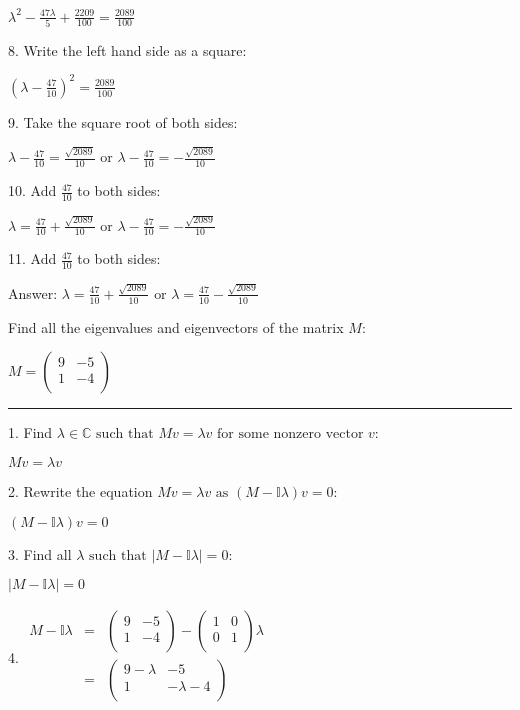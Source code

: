 \documentclass{article}
\begin{document}
$\lambda ^2-\frac{47 \lambda }{5}+\frac{2209}{100}=\frac{2089}{100}$

8. Write the left hand side as a square:

$\left(\lambda -\frac{47}{10}\right)^2=\frac{2089}{100}$

9. Take the square root of both sides:

$\lambda -\frac{47}{10}=\frac{\sqrt{2089}}{10}\text{ or }\lambda -\frac{47}{10}=-\frac{\sqrt{2089}}{10}$

10. Add $\frac{47}{10}$ to both sides:

$\lambda =\frac{47}{10}+\frac{\sqrt{2089}}{10}\text{ or }\lambda -\frac{47}{10}=-\frac{\sqrt{2089}}{10}$

11. Add $\frac{47}{10}$ to both sides:

Answer: $\lambda =\frac{47}{10}+\frac{\sqrt{2089}}{10}\text{ or }\lambda =\frac{47}{10}-\frac{\sqrt{2089}}{10}$

\pagebreak

Find all the eigenvalues and eigenvectors of the matrix $M:$

$M=\left(
\begin{array}{cc}
9 & -5 \\
 1 & -4 \\
\end{array}
\right)$

\hrule

1. Find $\lambda \in \mathbb{C}\text{ such that }M v=\lambda  v\text{ for some nonzero vector }v:$

$M v=\lambda  v$

2. Rewrite the equation $M v=\lambda  v\text{ as }(M-\mathbb{I} \lambda ) v=0:$

$(M-\mathbb{I} \lambda ) v=0$

3. Find all $\lambda\text{  such that }| M-\mathbb{I} \lambda | =0:$

$| M-\mathbb{I} \lambda | =0$

4. $\begin{array}{lll}
M-\mathbb{I} \lambda  & = & \left(
\begin{array}{cc}
9 & -5 \\
 1 & -4 \\
\end{array}
\right)-\left(
\begin{array}{cc}
1 & 0 \\
 0 & 1 \\
\end{array}
\right) \lambda  \\
\text{  }& = & \left(
\begin{array}{cc}
9-\lambda  & -5 \\
 1 & -\lambda -4 \\
\end{array}
\right) \\
\end{array}$
\end{document}
